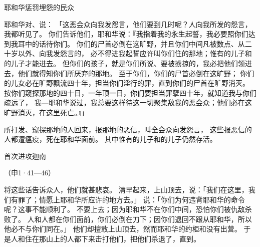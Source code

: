{\par }{\SH 耶和华惩罚埋怨的民众
\par }{\PP {}耶和华对{}、{}说：
「这恶会众向我发怨言，{}他们要到几时呢？{}人向我所发的怨言，我都听见了。
你们告诉他们，耶和华说：『我指着我的永生起誓，我必要照你们达到我耳中的话待你们。
你们的尸首必倒在这旷野，并且你们中间凡被数点、从二十岁以外、向我发怨言的，
必不得进我起誓应许叫你们住的那地；惟有{}的儿子{}和{}的儿子{}才能进去。
但你们的{}孩子，就是你们所说、要被掳掠的，我必把他们领进去，他们就得知你们所厌弃的那地。
至于你们，你们的尸首必倒在这旷野；
你们的儿女必在旷野飘流四十年，担当你们淫行的罪，直到你们的尸首在旷野消灭。
按你们窥探那地的四十日，一年顶一日，你们要担当罪孽四十年，就知道我与你们疏远了，
我—耶和华说过，我总要这样待这一切聚集敌我的恶会众；他们必在这旷野消灭，在这里死亡。』」
\par }{\PP {}所打发、窥探那地的人回来，报那地的恶信，叫全会众向{}发怨言，
这些报恶信的人都遭瘟疫，死在耶和华面前。
其中惟有{}的儿子{}和{}的儿子{}仍然存活。
\par }{\SH 首次进攻迦南
\par }{\R （申1·41—46）
\par }{\PP {}将这些话告诉{}众人，他们就甚悲哀。
清早起来，上山顶去，说：「我们在这里，我们有罪了；情愿上耶和华所应许的地方去。」
说：「你们为何违背耶和华的命令呢？这事不能顺利了。
不要上去；因为耶和华不在你们中间，恐怕你们被仇敌杀败了。
人和{}人都在你们面前，你们必倒在刀下；因你们退回不跟从耶和华，所以他必不与你们同在。」
他们却擅敢上山顶去，然而耶和华的约柜和{}没有出营。
于是{}人和住在那山上的{}人都下来击打他们，把他们杀退了，直到{}。

}

